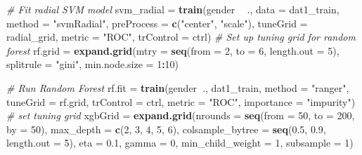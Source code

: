 \documentclass[]{article}
\newenvironment{Shaded}{\begin{snugshade}}{\end{snugshade}}
\newcommand{\KeywordTok}[1]{\textcolor[rgb]{0.13,0.29,0.53}{\textbf{#1}}}
\newcommand{\DataTypeTok}[1]{\textcolor[rgb]{0.13,0.29,0.53}{#1}}
\newcommand{\DecValTok}[1]{\textcolor[rgb]{0.00,0.00,0.81}{#1}}
\newcommand{\FloatTok}[1]{\textcolor[rgb]{0.00,0.00,0.81}{#1}}
\newcommand{\StringTok}[1]{\textcolor[rgb]{0.31,0.60,0.02}{#1}}
\newcommand{\CommentTok}[1]{\textcolor[rgb]{0.56,0.35,0.01}{\textit{#1}}}
\newcommand{\OperatorTok}[1]{\textcolor[rgb]{0.81,0.36,0.00}{\textbf{#1}}}
\newcommand{\NormalTok}[1]{#1}
\begin{document}
\begin{Shaded}
\begin{Highlighting}[]
{{\CommentTok{# Fit radial SVM model}
\NormalTok{svm_radial =}\StringTok{ }\KeywordTok{train}\NormalTok{(gender }\OperatorTok{~}\StringTok{ }\NormalTok{.,}
                   \DataTypeTok{data =}\NormalTok{ dat1_train,}
                   \DataTypeTok{method =} \StringTok{"svmRadial"}\NormalTok{,}
                   \DataTypeTok{preProcess =} \KeywordTok{c}\NormalTok{(}\StringTok{"center"}\NormalTok{, }\StringTok{"scale"}\NormalTok{),}
                   \DataTypeTok{tuneGrid =}\NormalTok{ radial_grid,}
                   \DataTypeTok{metric =} \StringTok{"ROC"}\NormalTok{,}
                   \DataTypeTok{trControl =}\NormalTok{ ctrl)}
\CommentTok{# Set up tuning grid for random forest}
\NormalTok{rf.grid =}\StringTok{ }\KeywordTok{expand.grid}\NormalTok{(}\DataTypeTok{mtry =} \KeywordTok{seq}\NormalTok{(}\DataTypeTok{from =} \DecValTok{2}\NormalTok{, }\DataTypeTok{to =} \DecValTok{6}\NormalTok{, }\DataTypeTok{length.out =} \DecValTok{5}\NormalTok{),}
                      \DataTypeTok{splitrule =} \StringTok{"gini"}\NormalTok{,}
                      \DataTypeTok{min.node.size =} \DecValTok{1}\OperatorTok{:}\DecValTok{10}\NormalTok{)}

\CommentTok{# Run Random Forest}
\NormalTok{rf.fit =}\StringTok{ }\KeywordTok{train}\NormalTok{(gender}\OperatorTok{~}\NormalTok{., dat1_train,}
               \DataTypeTok{method =} \StringTok{"ranger"}\NormalTok{,}
               \DataTypeTok{tuneGrid =}\NormalTok{ rf.grid, }
               \DataTypeTok{trControl =}\NormalTok{ ctrl,}
               \DataTypeTok{metric =} \StringTok{"ROC"}\NormalTok{,}
               \DataTypeTok{importance =} \StringTok{"impurity"}\NormalTok{)}
\CommentTok{# set tuning grid}
\NormalTok{xgbGrid =}\StringTok{ }\KeywordTok{expand.grid}\NormalTok{(}\DataTypeTok{nrounds =} \KeywordTok{seq}\NormalTok{(}\DataTypeTok{from =} \DecValTok{50}\NormalTok{, }\DataTypeTok{to =} \DecValTok{200}\NormalTok{, }\DataTypeTok{by =} \DecValTok{50}\NormalTok{),  }
                      \DataTypeTok{max_depth =} \KeywordTok{c}\NormalTok{(}\DecValTok{2}\NormalTok{, }\DecValTok{3}\NormalTok{, }\DecValTok{4}\NormalTok{, }\DecValTok{5}\NormalTok{, }\DecValTok{6}\NormalTok{),}
                      \DataTypeTok{colsample_bytree =} \KeywordTok{seq}\NormalTok{(}\FloatTok{0.5}\NormalTok{, }\FloatTok{0.9}\NormalTok{, }\DataTypeTok{length.out =} \DecValTok{5}\NormalTok{),}
                      \DataTypeTok{eta =} \FloatTok{0.1}\NormalTok{,}
                      \DataTypeTok{gamma =} \DecValTok{0}\NormalTok{,}
                      \DataTypeTok{min_child_weight =} \DecValTok{1}\NormalTok{,}
                      \DataTypeTok{subsample =} \DecValTok{1}\NormalTok{)}

}}
\end{Highlighting}
\end{Shaded}
\end{document}
